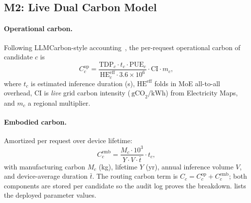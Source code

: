 \documentclass[10pt,twocolumn]{article}
\newcommand{\gcokwh}{\,\text{gCO}_2/\text{kWh}}
\begin{document}
\subsection{M2: Live Dual Carbon Model}
\label{sec:m2}

\paragraph{Operational carbon.} Following LLMCarbon-style
accounting~\cite{llmcarbon}, the per-request operational carbon of candidate
$c$ is
\begin{equation}
C^{\text{op}}_c = \frac{\text{TDP}_c \cdot t_c \cdot \text{PUE}_c}
                       {\text{HE}^{\text{eff}}_c \cdot 3.6\!\times\!10^{6}}
                  \cdot \text{CI} \cdot m_c,
\label{eq:op}
\end{equation}
where $t_c$ is estimated inference duration (s), $\text{HE}^{\text{eff}}$ folds
in MoE all-to-all overhead, $\text{CI}$ is \emph{live} grid carbon intensity
($\gcokwh$) from Electricity Maps, and $m_c$ a regional multiplier.

\paragraph{Embodied carbon.} Amortized per request over device lifetime:
\begin{equation}
C^{\text{emb}}_c = \frac{M_c \cdot 10^{3}}
                        {Y \cdot V \cdot \bar{t}} \cdot t_c,
\label{eq:emb}
\end{equation}
with manufacturing carbon $M_c$ (kg), lifetime $Y$ (yr), annual inference
volume $V$, and device-average duration $\bar t$. The routing carbon term is
$C_c = C^{\text{op}}_c + C^{\text{emb}}_c$; both components are stored per
candidate so the audit log proves the breakdown.  lists the
deployed parameter values.
\end{document}
